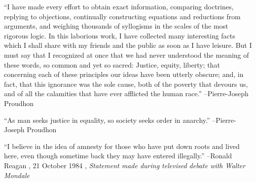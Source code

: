 \documentclass{article}%
\begin{document}
\linebreak%
\vspace{1mm}%
\begin{minipage}{\textwidth}%
\flushleft%
“I have made every effort to obtain exact information, comparing doctrines, replying to objections, continually constructing equations and reductions from arguments, and weighing thousands of syllogisms in the scales of the most rigorous logic. In this laborious work, I have collected many interesting facts which I shall share with my friends and the public as soon as I have leisure. But I must say that I recognized at once that we had never understood the meaning of these words, so common and yet so sacred: Justice, equity, liberty; that concerning each of these principles our ideas have been utterly obscure; and, in fact, that this ignorance was the sole cause, both of the poverty that devours us, and of all the calamities that have ever afflicted the human race.”%
\linebreak%
\vspace{1mm}%
–Pierre{-}Joseph Proudhon%
\linebreak%
\vspace{1mm}%
\end{minipage}%
\linebreak%
\vspace{1mm}%
\begin{minipage}{\textwidth}%
\flushleft%
“As man seeks justice in equality, so society seeks order in anarchy.”%
\linebreak%
\vspace{1mm}%
–Pierre{-}Joseph Proudhon%
\linebreak%
\vspace{1mm}%
\end{minipage}%
\linebreak%
\vspace{1mm}%
\begin{minipage}{\textwidth}%
\flushleft%
“I believe in the idea of amnesty for those who have put down roots and lived here, even though sometime back they may have entered illegally.”%
\linebreak%
\vspace{1mm}%
–Ronald Reagan%
, 21 October 1984%
, \textit{Statement made during televised debate with Walter Mondale}%
\linebreak%
\vspace{1mm}%
\end{minipage}%
\linebreak%
\vspace{1mm}%
\end{document}
